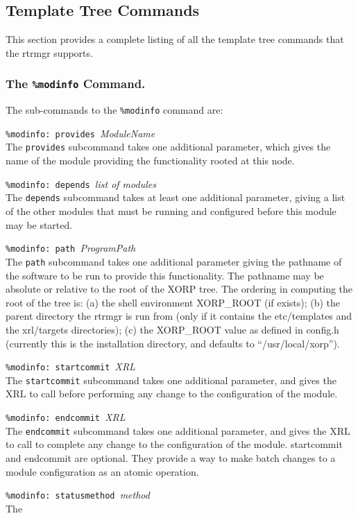 \documentclass[11pt]{article}
\begin{document}
\subsection{Template Tree Commands}
This section provides a complete listing of all the template tree
commands that the rtrmgr supports.
\subsubsection{The {\tt \%modinfo} Command.}
The sub-commands to the {\tt \%modinfo} command are:
\begin{description}
\item {{\tt \%modinfo: provides }{\it ModuleName}}  \\The {\tt provides} subcommand takes one additional
parameter, which gives the name of the module providing the
functionality rooted at this node.  
\item {{\tt \%modinfo: depends }{\it list of modules}}  \\The {\tt depends} subcommand takes at least one additional
parameter, giving a list of the other modules that must
be running and configured before this module may be started.
\item {{\tt \%modinfo: path }{\it ProgramPath}}  \\The {\tt path} subcommand takes one additional parameter giving the pathname of the software to be run
to provide this functionality.  The pathname may be absolute or
relative to the root of the XORP tree. The ordering in computing the root of
the tree is: (a) the shell environment XORP\_ROOT (if exists); (b) the parent
directory the rtrmgr is run from (only if it contains the
etc/templates and the xrl/targets directories); (c) the XORP\_ROOT value as
defined in config.h (currently this is the installation directory, and
defaults to ``/usr/local/xorp'').
\item {{\tt \%modinfo: startcommit }{\it XRL}}  \\The {\tt startcommit} subcommand takes one additional
parameter, and gives the XRL to call before performing
any change to the configuration of the module.
\item {{\tt \%modinfo: endcommit }{\it XRL}}  \\The {\tt endcommit} subcommand takes one additional
parameter, and gives the XRL to call to complete any
change to the configuration of the module.  startcommit and
endcommit are optional.  They provide a way to make batch changes to a
module configuration as an atomic operation.
\item {{\tt \%modinfo: statusmethod }{\it method}}  \\The {\tt
}
\end{description}
\end{document}
